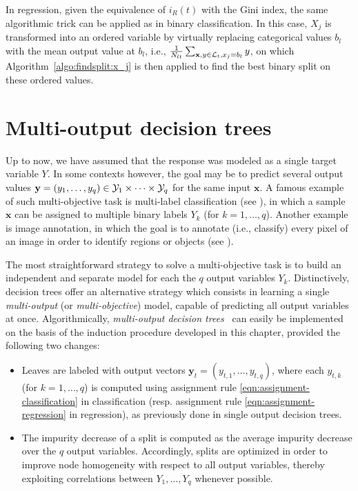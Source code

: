 In regression, given the equivalence of $i_R(t)$ with the Gini index, the same
algorithmic trick can be applied as in binary classification. In this case,
$X_j$ is transformed into an ordered variable by virtually replacing
categorical values $b_l$ with the mean output value at $b_l$, i.e.,
$\tfrac{1}{N_{lt}} \sum_{\mathbf{x}, y \in {\cal L}_t, x_j = b_l} y$, on which
Algorithm~\ref{algo:findsplit:x_j} is then applied to find the best binary
split on these ordered values.


\section{Multi-output decision trees}

Up to now, we have assumed that the response was modeled as a single target
variable $Y$. In some contexts however, the goal may be to predict several
output values $\mathbf{y} = (y_1, \dots, y_q) \in {\cal Y}_1 \times \dots
\times {\cal Y}_q$ for the same input $\mathbf{x}$. A famous example of such
multi-objective task is multi-label classification (see
\citep{tsoumakas:2007}), in which a sample $\mathbf{x}$ can be assigned to
multiple binary labels $Y_k$ (for $k = 1, \dots, q$). Another example is image
annotation, in which the goal is to annotate (i.e., classify) every pixel of an
image  in order to identify regions or objects (see \citep{zhang:2012}).

The most straightforward strategy to solve a multi-objective task is to build
an independent and separate model for each the $q$ output variables $Y_k$.
Distinctively, decision trees offer an alternative strategy which consists in
learning a single \textit{multi-output} (or \textit{multi-objective}) model,
capable of predicting all output variables at once. Algorithmically,  \textit
{multi-output decision trees}~\citep{dumont:2007,kocev:2007} can easily be
implemented on the basis of the induction procedure developed in this chapter,
provided the following two changes:
\begin{itemize}
\item Leaves are labeled with output vectors $\mathbf{y}_t = (y_{t,1}, \dots, y_{t,q})$,
      where each $y_{t,k}$ (for $k=1,\dots,q$) is computed using assignment rule
      \ref{eqn:assignment-classification} in classification (resp. assignment
      rule \ref{eqn:assignment-regression} in regression), as previously
      done in single output decision trees.

\item The impurity decrease of a split is computed as the average impurity decrease
      over the $q$ output variables. Accordingly, splits are optimized
      in order to improve node homogeneity with respect to all output variables,
      thereby exploiting correlations between $Y_1, \dots, Y_q$ whenever possible.

\end{itemize}

